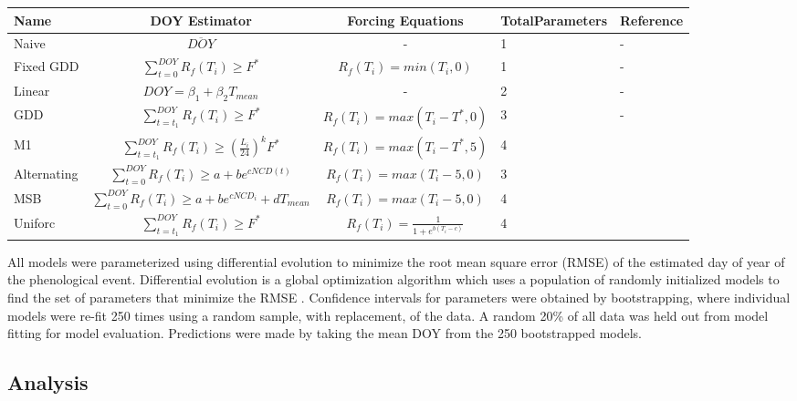 \documentclass[fleqn,10pt,lineno]{wlpeerj} %
\begin{document}
\begin{center}
{\def\arraystretch{2}\tabcolsep=5pt
    \begin{tabular}{ | l | c | c | p{1.3cm} | l |}
    \hline
    Name & DOY Estimator & Forcing Equations & Total\newline Parameters & Reference \\ \hline
    Naive & \( \overline{DOY} \) & - & 1 & - \\
    Fixed GDD &$\sum_{t=0}^{DOY}R_{f}(T_{i})\geq F^{*} $  & $R_{f}(T_{i}) = min(T_{i}, 0)$ & 1 & - \\
    Linear & \( DOY = \beta_{1} + \beta_{2}T_{mean} \) & - & 2 & - \\
    GDD & $\sum_{t=t_{1}}^{DOY}R_{f}(T_{i})\geq F^{*} $ & $ R_{f}(T_{i}) = max(T_{i} - T^{*}, 0) $  & 3 & - \\
    M1 & $\sum_{t=t_{1}}^{DOY}R_{f}(T_{i})\geq (\frac{L_{i}}{24})^{k} F^{*} $ & $ R_{f}(T_{i}) = max(T_{i}-T^{*}, 5) $  & 4 & \citep{blumel2012} \\
    Alternating & $\sum_{t=0}^{DOY}R_{f}(T_{i})\geq a + be^{cNCD(t)} $ & $R_{f}(T_{i}) = max(T_{i}-5, 0) $ & 3 & \citep{cannell1983} \\
    MSB & $\sum_{t=0}^{DOY}R_{f}(T_{i})\geq a + be^{cNCD_{i}} +dT_{mean} $ & $R_{f}(T_{i}) = max(T_{i}-5, 0) $ & 4 & \citep{jeong2013} \\
    Uniforc &  $\sum_{t=t_{1}}^{DOY}R_{f}(T_{i})\geq F^{*} $ & $ R_{f}(T_{i}) = \frac{1}{1 + e^{b(T_{i}-c)}} $ & 4 & \citep{chuine2000} \\

    \hline
    \end{tabular}
    }
\end{center}

All models were parameterized using differential evolution to minimize the root mean square error (RMSE) of the estimated day of year of the phenological event. Differential evolution is a global optimization algorithm which uses a population of randomly initialized models to find the set of parameters that minimize the RMSE \citep{storn1997}. Confidence intervals for parameters were obtained by bootstrapping, where individual models were re-fit 250 times using a random sample, with replacement, of the data. A random 20\% of all data was held out from model fitting for model evaluation. Predictions were made by taking the mean DOY from the 250 bootstrapped models. 

\subsection*{Analysis}
\end{document}
